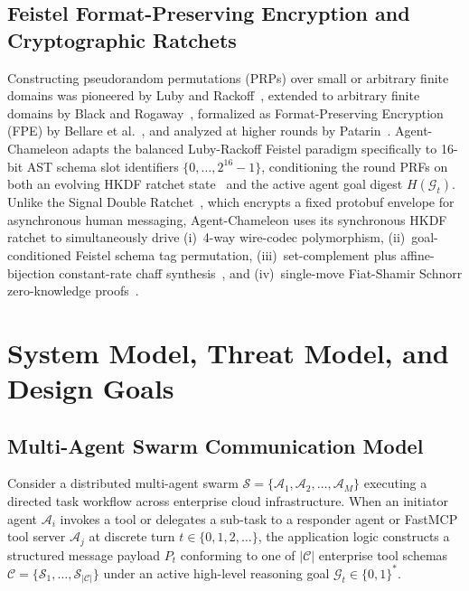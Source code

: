 \documentclass[conference,10pt]{IEEEtran}
\begin{document}
\subsection{Feistel Format-Preserving Encryption and Cryptographic Ratchets}
Constructing pseudorandom permutations (PRPs) over small or arbitrary finite domains was pioneered by Luby and Rackoff~\cite{luby1988construct}, extended to arbitrary finite domains by Black and Rogaway~\cite{black2002ciphers}, formalized as Format-Preserving Encryption (FPE) by Bellare et al.~\cite{bellare2009format}, and analyzed at higher rounds by Patarin~\cite{patarin2004luby}. Agent-Chameleon adapts the balanced Luby-Rackoff Feistel paradigm specifically to 16-bit AST schema slot identifiers $\{0,\dots,2^{16}-1\}$, conditioning the round PRFs on both an evolving HKDF ratchet state~\cite{krawczyk2010hkdf} and the active agent goal digest $H(\mathcal{G}_t)$. Unlike the Signal Double Ratchet~\cite{cohn2020double}, which encrypts a fixed protobuf envelope for asynchronous human messaging, Agent-Chameleon uses its synchronous HKDF ratchet to simultaneously drive (i)~4-way wire-codec polymorphism, (ii)~goal-conditioned Feistel schema tag permutation, (iii)~set-complement plus affine-bijection constant-rate chaff synthesis~\cite{nir2018chacha20, dworkin2015sha3}, and (iv)~single-move Fiat-Shamir Schnorr zero-knowledge proofs~\cite{fiat1986how, schnorr1991efficient, goldwasser1989knowledge, bellare1993random, pointcheval2000security}.

\section{System Model, Threat Model, and Design Goals}
\label{sec:model}

\subsection{Multi-Agent Swarm Communication Model}
Consider a distributed multi-agent swarm $\mathcal{S} = \{\mathcal{A}_1, \mathcal{A}_2, \dots, \mathcal{A}_M\}$ executing a directed task workflow across enterprise cloud infrastructure. When an initiator agent $\mathcal{A}_i$ invokes a tool or delegates a sub-task to a responder agent or FastMCP tool server $\mathcal{A}_j$ at discrete turn $t \in \{0, 1, 2, \dots\}$, the application logic constructs a structured message payload $P_t$ conforming to one of $|\mathcal{C}|$ enterprise tool schemas $\mathcal{C} = \{\mathcal{S}_1, \dots, \mathcal{S}_{|\mathcal{C}|}\}$ under an active high-level reasoning goal $\mathcal{G}_t \in \{0,1\}^*$.
\end{document}
